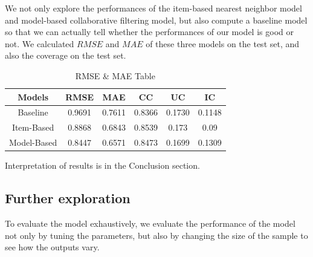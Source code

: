 \documentclass[12pt,journal,compsoc]{IEEEtran}
\begin{document}
We not only explore the performances of the item-based nearest neighbor model and model-based collaborative filtering model, but also compute a baseline model so that we can actually tell whether the performances of our model is good or not. We calculated $RMSE$ and $MAE$ of these three models on the test set, and also the coverage on the test set.




\begin{table}[H] 
\centering
\caption{\label{tab_est:1} RMSE \& MAE Table}
\label{my-label}
\begin{tabular}{c|ccccc}
\hline \hline

Models  & RMSE &  MAE  & CC & UC & IC       \\ \hline
Baseline &0.9691 &0.7611 &0.8366 &0.1730 &0.1148 \\ \hline
Item-Based      & 0.8868     &  0.6843   &0.8539 &0.173 &0.09 \\ \hline
Model-Based     &  0.8447       &  0.6571  & 0.8473 & 0.1699 & 0.1309 \\ \hline
\hline
\end{tabular}
\end{table}

Interpretation of results is in the Conclusion section.

\subsection{Further exploration}
To evaluate the model exhaustively, we evaluate the performance of the model not only by tuning the parameters, but also by changing the size of the sample to see how the outputs vary. 
\end{document}
